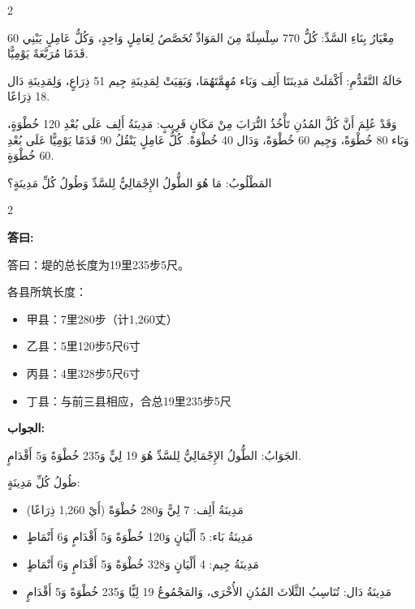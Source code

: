 \documentclass[11pt,a4paper]{article}
\newcommand{\ar}[1]{\arabicfont\beginR #1\endR}
\newenvironment{bilingual}{%
  \begin{paracol}{2}
}{%
  \end{paracol}
}
\newcommand{\cnlabel}[1]{\textcolor{algocolor}{\textbf{#1}}}
\newcommand{\arlabel}[1]{\ar{\textcolor{algocolor}{\textbf{#1}}}}
\begin{document}
\begin{bilingual}
\begin{rightcolumn*}
\ar{مِعْيَارُ بِنَاءِ السَّدِّ: كُلُّ 770 سِلْسِلَةً مِنَ المَوَادِّ تُخَصَّصُ لِعَامِلٍ وَاحِدٍ، وَكُلُّ عَامِلٍ يَبْنِي 60 قَدَمًا مُرَبَّعَةً يَوْمِيًّا.}

\ar{حَالَةُ التَّقَدُّمِ: أَكْمَلَتْ مَدِينَتَا أَلِف وَبَاء مُهِمَّتَهُمَا، وَبَقِيَتْ لِمَدِينَةِ جِيم 51 ذِرَاعٍ، وَلِمَدِينَةِ دَال 18 ذِرَاعًا.}

\ar{وَقَدْ عُلِمَ أَنَّ كُلَّ المُدُنِ تَأْخُذُ التُّرَابَ مِنْ مَكَانٍ قَرِيبٍ: مَدِينَةُ أَلِف عَلَى بُعْدِ 120 خُطْوَةٍ، وَبَاء 80 خُطْوَةً، وَجِيم 60 خُطْوَةً، وَدَال 40 خُطْوَةً. كُلُّ عَامِلٍ يَنْقُلُ 90 قَدَمًا يَوْمِيًّا عَلَى بُعْدِ 60 خُطْوَةٍ.}

\ar{المَطْلُوبُ: مَا هُوَ الطُّولُ الإِجْمَالِيُّ لِلسَّدِّ وَطُولُ كُلِّ مَدِينَةٍ؟}
\end{rightcolumn*}

\end{bilingual}

\vspace{1em}

\begin{bilingual}

\begin{leftcolumn*}
\cnlabel{答曰:}

答曰：堤的总长度为19里235步5尺。

各县所筑长度：
\begin{itemize}
  \item 甲县：7里280步（计1,260丈）
  \item 乙县：5里120步5尺6寸
  \item 丙县：4里328步5尺6寸
  \item 丁县：与前三县相应，合总19里235步5尺
\end{itemize}
\end{leftcolumn*}

\begin{rightcolumn*}
\arlabel{الجواب:}

\ar{الجَوَابُ: الطُّولُ الإِجْمَالِيُّ لِلسَّدِّ هُوَ 19 لِيٍّ وَ235 خُطْوَةً وَ5 أَقْدَامٍ.}

\ar{طُولُ كُلِّ مَدِينَةٍ:}
\begin{itemize}
  \item \ar{مَدِينَةُ أَلِف: 7 لِيًّ وَ280 خُطْوَةً (أَيْ 1,260 ذِرَاعًا)}
  \item \ar{مَدِينَةُ بَاء: 5 أَلْيَانٍ وَ120 خُطْوَةً وَ5 أَقْدَامٍ وَ6 أَنْمَاطٍ}
  \item \ar{مَدِينَةُ جِيم: 4 أَلْيَانٍ وَ328 خُطْوَةً وَ5 أَقْدَامٍ وَ6 أَنْمَاطٍ}
  \item \ar{مَدِينَةُ دَال: تُنَاسِبُ الثَّلَاثَ المُدُنِ الأُخْرَى، وَالمَجْمُوعُ 19 لِيًّا وَ235 خُطْوَةً وَ5 أَقْدَامٍ}
\end{itemize}
\end{rightcolumn*}

\end{bilingual}
\end{document}
